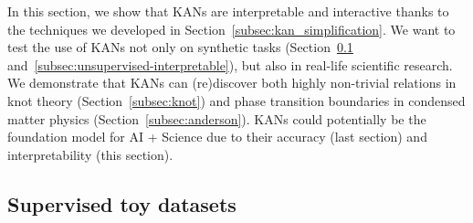 \documentclass{article}
\numberwithin{equation}{section}
\numberwithin{figure}{section}
\newcommand{\zm}[1]{{\color{black!0!blue} #1}}
\begin{document}
In this section, we show that KANs are interpretable and interactive thanks to the techniques we developed in Section~\ref{subsec:kan_simplification}.  We want to test the use of KANs not only on synthetic tasks (Section~\ref{subsec:supervised-interpretable} and~\ref{subsec:unsupervised-interpretable}), but also in real-life scientific research. We demonstrate that KANs can (re)discover both highly non-trivial relations in knot theory  (Section~\ref{subsec:knot}) and phase transition boundaries in condensed matter physics (Section~\ref{subsec:anderson}). KANs could potentially be the foundation model for AI + Science due to their accuracy (last section) and interpretability (this section).

\subsection{Supervised toy datasets}\label{subsec:supervised-interpretable}
\end{document}
